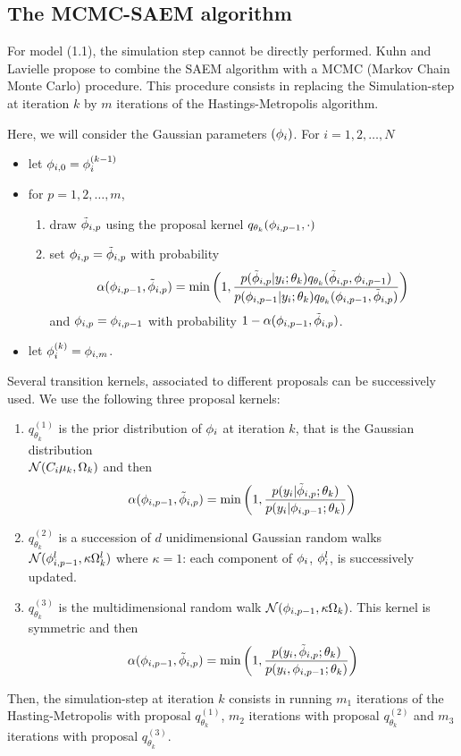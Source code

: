 \subsection{The MCMC-SAEM algorithm}
For model (1.1), the simulation step cannot be directly performed. Kuhn and Lavielle \cite{Kuhn01} propose to combine the SAEM algorithm with a MCMC (Markov Chain Monte Carlo) procedure. This procedure consists in replacing the Simulation-step at iteration $k$ by $m$ iterations of the Hastings-Metropolis algorithm.

Here, we will consider the Gaussian parameters $({{\phi}_i})$. For $i=1,2,\ldots,N$
\begin{itemize}
\item let ${\phi}_{i,0}={\phi}_{i}^{(k-1)}$
\item for $p=1,2,\ldots,m$,
\begin{enumerate}
\item draw $ \tilde{{\phi}}_{i,p}$ using the proposal kernel
$ q_{\theta_k}( {\phi}_{i,p-1} ,\cdot) $
\item set $ {\phi}_{i,p} =  \tilde{{\phi}}_{i,p} $ with probability
$$ \alpha( {\phi}_{i,p-1} ,  \tilde{{\phi}}_{i,p} ) = \min \left(1, \frac
{ p( \tilde{{\phi}}_{i,p} |y_i;\theta_k) q_{\theta_k}(\tilde{{\phi}}_{i,p} , {\phi}_{i,p-1} )}
{ p( {\phi}_{i,p-1} |y_i;\theta_k) q_{\theta_k}({\phi}_{i,p-1} ,\tilde{{\phi}}_{i,p} )} \right)$$ and
${\phi}_{i,p} =  {\phi}_{i,p-1}$ with probability $1- \alpha( {\phi}_{i,p-1} ,  \tilde{{\phi}}_{i,p} ) $.
\end{enumerate}
\item let ${\phi}_i^{(k)} =  {\phi}_{i,m}$.
 \end{itemize}

Several transition kernels, associated to different proposals can be successively used. We use the following three proposal kernels:

\begin{enumerate}
\item $q_{\theta_k}^{(1)}$  is the prior distribution of ${\phi}_i$ at iteration $k$, that is the Gaussian distribution \\
${\cal N}(C_i\fixed_effect_k,\IIV_k)$ and then
$$ \alpha( {\phi}_{i,p-1} ,  \tilde{{\phi}}_{i,p} ) = \min \left(1, \frac{ p( y_i|\tilde{{\phi}}_{i,p};\theta_k) } { p( y_i|{\phi}_{i,p-1};\theta_k) } \right)$$
\item $q_{\theta_k}^{(2)}$ is a succession of $d$ unidimensional Gaussian random walks ${\cal N}( {\phi}^l_{i,p-1} , \kappa{\Omega}^l_k)$ where $\kappa=1$: each component of ${\phi}_i$, ${\phi}^l_i$, is successively updated.
\item $q_{\theta_k}^{(3)}$ is the multidimensional random walk ${\cal N}( {\phi}_{i,p-1} , \kappa{\Omega}_k)$. This kernel is symmetric and then 
$$ \alpha( {\phi}_{i,p-1} ,  \tilde{{\phi}}_{i,p} ) = \min \left(1, \frac{ p( y_i,\tilde{{\phi}}_{i,p};\theta_k) } { p( y_i,{\phi}_{i,p-1};\theta_k) } \right)$$
\end{enumerate}
Then, the simulation-step at iteration $k$ consists in running $m_1$ iterations of the Hasting-Metropolis with proposal $q_{\theta_k}^{(1)}$, $m_2$ iterations with proposal $q_{\theta_k}^{(2)}$ and $m_3$ iterations with proposal $q_{\theta_k}^{(3)}$.

